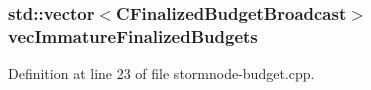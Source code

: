 \subsubsection[{vec\+Immature\+Finalized\+Budgets}]{\setlength{\rightskip}{0pt plus 5cm}std\+::vector$<${\bf C\+Finalized\+Budget\+Broadcast}$>$ vec\+Immature\+Finalized\+Budgets}\label{stormnode-budget_8h_adc3baf3c59479fff7d14e28c1496a178}


Definition at line 23 of file stormnode-\/budget.\+cpp.

